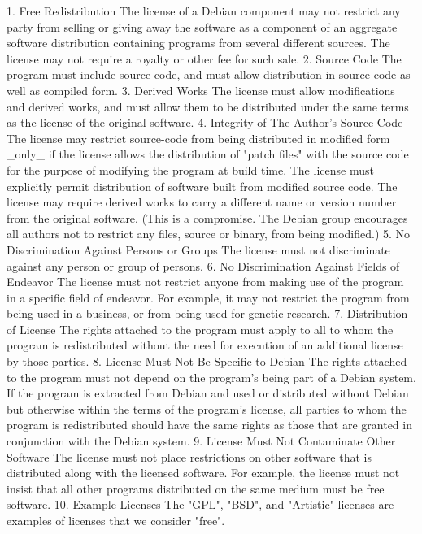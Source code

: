 \documentclass[mingoth,a4paper]{jsarticle}
\begin{document}
{{{{{\begin{commandline}
    1. Free Redistribution
       The license of a Debian component may not restrict any party from
       selling or giving away the software as a component of an aggregate
       software distribution containing programs from several different
       sources. The license may not require a royalty or other fee for
       such sale.
    2. Source Code
       The program must include source code, and must allow distribution
       in source code as well as compiled form.
    3. Derived Works
       The license must allow modifications and derived works, and must
       allow them to be distributed under the same terms as the license
       of the original software.
    4. Integrity of The Author's Source Code
       The license may restrict source-code from being distributed in
       modified form _only_ if the license allows the distribution of
       "patch files" with the source code for the purpose of modifying
       the program at build time. The license must explicitly permit
       distribution of software built from modified source code. The
       license may require derived works to carry a different name or
       version number from the original software. (This is a compromise.
       The Debian group encourages all authors not to restrict any files,
       source or binary, from being modified.)
    5. No Discrimination Against Persons or Groups
       The license must not discriminate against any person or group of
       persons.
    6. No Discrimination Against Fields of Endeavor
       The license must not restrict anyone from making use of the
       program in a specific field of endeavor. For example, it may not
       restrict the program from being used in a business, or from being
       used for genetic research.
    7. Distribution of License
       The rights attached to the program must apply to all to whom the
       program is redistributed without the need for execution of an
       additional license by those parties.
    8. License Must Not Be Specific to Debian
       The rights attached to the program must not depend on the
       program's being part of a Debian system. If the program is
       extracted from Debian and used or distributed without Debian but
       otherwise within the terms of the program's license, all parties
       to whom the program is redistributed should have the same rights
       as those that are granted in conjunction with the Debian system.
    9. License Must Not Contaminate Other Software
       The license must not place restrictions on other software that is
       distributed along with the licensed software. For example, the
       license must not insist that all other programs distributed on the
       same medium must be free software.
   10. Example Licenses
       The "GPL", "BSD", and "Artistic" licenses are examples of licenses
       that we consider "free".


\end{commandline}}}}}}
\end{document}

